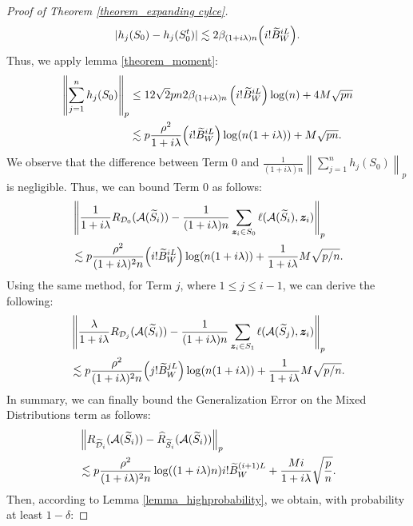 \begin{proof}[Proof of Theorem \ref{theorem_expanding cylce}]
\begin{align}
| h_j(S_0)-h_j(S_0^t)|\lesssim 2\beta_{(1+i\lambda)n}\Big(i !\widetilde{B}_W^{iL}\Big)\notag. 
\end{align}
Thus, we apply lemma \ref{theorem_moment}:
$$
\begin{aligned}
\left\|\sum_{j=1}^{n} h_j(S_{0})\right\|_p & \leq 12 \sqrt{2} p n 2\beta_{(1+i\lambda)n}\left(i !\widetilde{B}_W^{iL}\right) \log (n)+4 M \sqrt{p n} \notag \\
&\lesssim  p \frac{\rho^2}{1+i\lambda}\Big(i !\widetilde{B}_W^{iL}\Big) \log (n(1+i\lambda))+ M \sqrt{p n}.\\
\end{aligned}
$$
We observe that the difference between Term 0 and $\frac{1}{(1+i\lambda)n}\left\|\sum_{j=1}^{n} h_j(S_{0})\right\|_p$ is negligible. Thus, we can bound Term 0 as follows:
\begin{align}
   & \left\|\frac{1}{1+i\lambda} R_{\mathcal{D}_0}(\mathcal{A}(\widetilde{S}_i))-\frac{1}{(1+i\lambda)n}\sum_{\boldsymbol{z}_{i}\in S_{0}}\ell(\mathcal{A}(\widetilde{S}_i),\boldsymbol{z}_{i})\right\|_{p}\notag \\
   & \lesssim p \frac{\rho^2}{(1+i\lambda)^2n}\Big(i !\widetilde{B}_W^{iL}\Big) \log (n(1+i\lambda))+ \frac{1}{1+i\lambda}M \sqrt{p/n}.
\end{align}
Using the same method, for Term $j$, where $1 \leq j \leq i-1$, we can derive the following:
\begin{align}
  &  \left\|\frac{\lambda}{1+i\lambda}R_{\mathcal{D}_j}(\mathcal{A}(\widetilde{S}_i))-\frac{1}{(1+i\lambda)n}\sum_{\boldsymbol{z}_{i}\in S_{1}}\ell(\mathcal{A}(\widetilde{S}_j),\boldsymbol{z}_{i})\right\|_{p}\notag \\
  &\lesssim p \frac{\rho^2}{(1+i\lambda)^2n}\Big(j !\widetilde{B}_W^{jL}\Big) \log (n(1+i\lambda))+\frac{1}{1+i\lambda}M \sqrt{p/n}.
\end{align}
In summary, we can finally bound the Generalization Error on the Mixed Distributions term as follows:
\begin{align}
 &\left\|R_{\widetilde{\mathcal{D}}_i}(\mathcal{A}(\widetilde{S}_i))-\widehat{R}_{\widetilde{S}_i}(\mathcal{A}(\widetilde{S}_i))\right\|_{p} \notag \\
 &\lesssim p \frac{\rho^2}{(1+i\lambda)^2n} \log ((1+i\lambda) n)i!\widetilde{B}_W^{(i+1) L}+\frac{Mi}{1+i\lambda} \sqrt{\frac{p}{n}}. \notag
\end{align}
Then, according to Lemma \ref{lemma_highprobability}, we obtain, with probability at least $1-\delta$:

\end{proof}
